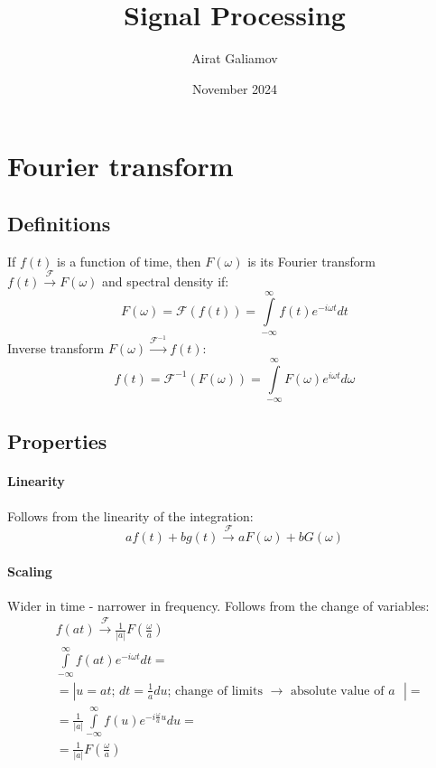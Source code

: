 \documentclass{article}
\title{Signal Processing}
\author{Airat Galiamov}
\date{November 2024}
\begin{document}
\maketitle

\section{Fourier transform}
\subsection{Definitions}
If $f(t)$ is a function of time, then $F(\omega)$ is its Fourier transform $f(t) \xrightarrow {\mathcal{F}} F(\omega)$ and spectral density if:
\begin{equation*}
    F(\omega) = \mathcal{F}(f(t)) = \int \limits^{\infty}_{-\infty} f(t) e^{-i\omega t}dt
\end{equation*}
Inverse transform $F(\omega) \xrightarrow{\mathcal{F}^{-1}} f(t)$:
\begin{equation*}
    f(t) = \mathcal{F}^{-1}(F(\omega)) = \int \limits^{\infty}_{-\infty} F(\omega) e^{i\omega t}d\omega
\end{equation*}

\subsection{Properties}

\paragraph{Linearity} Follows from the linearity of the integration:
\begin{equation*}
    a f(t) + b g(t) \xrightarrow{\mathcal{F}} a F(\omega) + b G(\omega)
\end{equation*}
\paragraph{Scaling} Wider in time - narrower in frequency. Follows from the change of variables:
\begin{align*}
    &f(at) \xrightarrow{\mathcal{F}}  \frac{1}{\left| a \right|} F(\frac{\omega}{a})  \\
    &\int \limits^{\infty}_{-\infty} f(at) e^{-i\omega t}dt = \\
    & = \left| u = at; \, dt = \frac{1}{a}du; \, \text{change of limits $\rightarrow$ absolute value of $a$ }\right| =\\
    & = \frac{1}{\left| a \right|} \int \limits^{\infty}_{-\infty} f(u) e^{-i \frac{\omega}{a} u }du =  \\
    & =\frac{1}{\left| a \right|} F(\frac{\omega}{a})
\end{align*}
\end{document}
